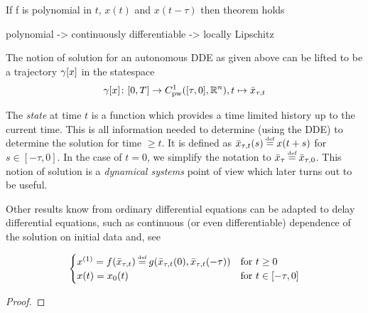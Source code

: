 \begin{corollary}
    \label{corollary}
    If f is polynomial in $t$, $x(t)$ and $x(t-\tau)$ then theorem holds

    polynomial -> continuously differentiable -> locally Lipschitz


    The notion of solution for an autonomous DDE as given above can be lifted to be a trajectory $\gamma[x]$ in the statespace
    \begin{equation}
        \trajectory[x] \from [0,T] \to \statespace[\tau],\\
        t \mapsto \xbartaut{t}
    \end{equation}

    The \emph{state} at time $t$ is a function which provides a time limited history up to the current time. This is all information needed to determine (using the DDE) to determine the solution for time $\geq t$. It is defined as $\xbartaut{t}(s)\defeq x(t+s)$ for $s\in [-\tau,0]$. In the case of $t=0$, we simplify the notation to $\xbartau \defeq \xbartaut{0}$.
    This notion of solution is a \emph{dynamical systems} point of view which later turns out to be useful.

  Other results know from ordinary differential equations can be adapted to delay differential equations, such as continuous (or even differentiable) dependence of the solution on initial data and, see \cite{Dads06DDEs} %


\begin{equation}
    \begin{cases}
        \D{x}=f(\xbartaut{t})\defeq g(\xbartaut{t}(0),\xbartaut{t}(-\tau)) &\text{for } t\geq 0\\
        x(t)=x_0(t) & \text{for } t\in[-\tau,0]
    \end{cases}
\end{equation}
\end{corollary}

\begin{proof}

\end{proof}


